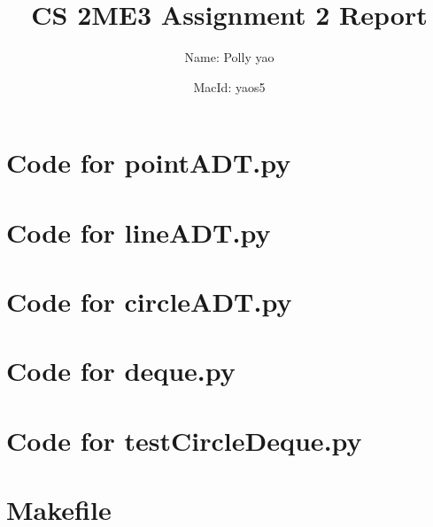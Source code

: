 \documentclass[12pt]{article}
\title{CS 2ME3 Assignment 2 Report}
\author{Name: Polly yao
             \and 
              MacId: yaos5}
\begin{document}
\maketitle

\lstset{language=Python, basicstyle=\tiny,breaklines=true,showspaces=false,showstringspaces=false,breakatwhitespace=true}

\def\thesection{\Alph{section}} 

\section{Code for pointADT.py} \label{pointSect}

\noindent 

\newpage

\section{Code for lineADT.py} \label{lineSect}

\noindent 

\newpage

\section{Code for circleADT.py} \label{cirlceSect}

\noindent 

\newpage

\section{Code for deque.py} \label{dequeSect}

\noindent 

\newpage

\section{Code for testCircleDeque.py} \label{testCircleDequeSect}

\noindent 

\newpage

\section{Makefile} \label{MakefileSect}
\end{document}
